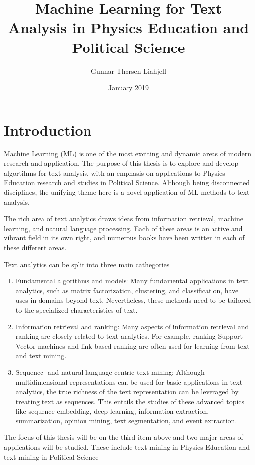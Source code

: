 \documentclass{article}
\title{Machine Learning for Text Analysis in Physics Education and Political Science}
\author{Gunnar Thorsen Liahjell}
\date{January 2019}
\begin{document}
\maketitle

\section*{Introduction}


Machine Learning (ML) is one of the most exciting and dynamic areas of
modern research and application. The purpose of this thesis is to
explore and develop algortihms for text analysis, with an emphasis on
applications to Physics Education research and studies in Political
Science. Although being disconnected disciplines, the unifying theme
here is a novel application of ML methods to text analysis.

The rich area of text analytics draws ideas from information
retrieval, machine learning, and natural language processing. Each of
these areas is an active and vibrant field in its own right, and
numerous books have been written in each of these different areas.

Text analytics can be split into three main cathegories:

\begin{enumerate}
\item Fundamental algorithms and models: Many
fundamental applications in text analytics, such as matrix
factorization, clustering, and classification, have uses in domains
beyond text. Nevertheless, these methods need to be tailored to the
specialized characteristics of text. 
\item Information retrieval and ranking: Many aspects of
information retrieval and ranking are closely related to text
analytics. For example, ranking Support Vector machines and link-based ranking are often
used for learning from text and text mining. 
\item  Sequence- and natural language-centric text mining: Although
multidimensional representations can be used for basic applications
in text analytics, the true richness of the text representation can be
leveraged by treating text as sequences. This entails the studies of
these advanced topics like sequence embedding, deep learning,
information extraction, summarization, opinion mining, text
segmentation, and event extraction.
\end{enumerate}

The focus of this thesis will be on the third item above and two major
areas of applications will be studied. These include text mining in
Physics Education and text mining in Political Science
\end{document}
